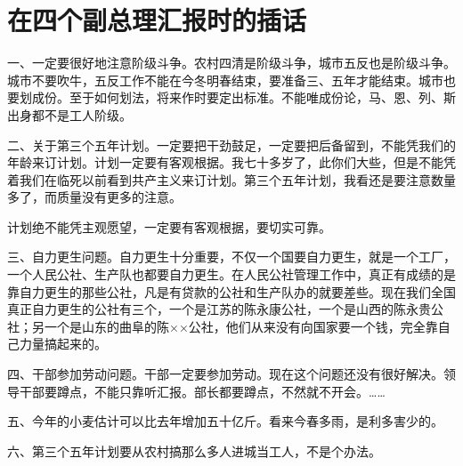 \section[在四个副总理汇报时的插话（一九六四年五月）]{在四个副总理汇报时的插话}


一、一定要很好地注意阶级斗争。农村四清是阶级斗争，城市五反也是阶级斗争。城市不要吹牛，五反工作不能在今冬明春结束，要准备三、五年才能结束。城市也要划成份。至于如何划法，将来作时要定出标准。不能唯成份论，马、恩、列、斯出身都不是工人阶级。

二、关于第三个五年计划。一定要把干劲鼓足，一定要把后备留到，不能凭我们的年龄来订计划。计划一定要有客观根据。我七十多岁了，此你们大些，但是不能凭着我们在临死以前看到共产主义来订计划。第三个五年计划，我看还是要注意数量多了，而质量没有更多的注意。

计划绝不能凭主观愿望，一定要有客观根据，要切实可靠。

三、自力更生问题。自力更生十分重要，不仅一个国要自力更生，就是一个工厂，一个人民公社、生产队也都要自力更生。在人民公社管理工作中，真正有成绩的是靠自力更生的那些公社，凡是有贷款的公社和生产队办的就要差些。现在我们全国真正自力更生的公社有三个，一个是江苏的陈永康公社，一个是山西的陈永贵公社；另一个是山东的曲阜的陈××公社，他们从来没有向国家要一个钱，完全靠自己力量搞起来的。

四、干部参加劳动问题。干部一定要参加劳动。现在这个问题还没有很好解决。领导干部要蹲点，不能只靠听汇报。部长都要蹲点，不然就不开会。……

五、今年的小麦估计可以比去年增加五十亿斤。看来今春多雨，是利多害少的。

六、第三个五年计划要从农村搞那么多人进城当工人，不是个办法。

